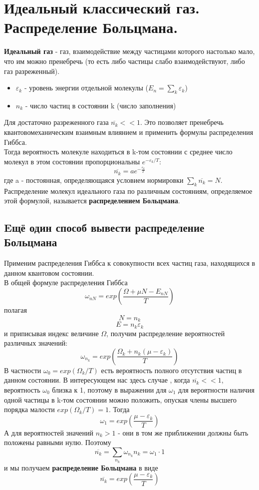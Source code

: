 \section{Идеальный классический газ. Распределение Больцмана.}
\textbf{Идеальный газ} - газ, взаимодействие между частицами которого настолько мало, что им можно пренебречь (то есть либо частицы слабо взаимодействуют, либо газ разреженный).
\begin{itemize}
	\item $\varepsilon_k$ - уровень энергии отдельной молекулы ($E_n = \sum_{k}\varepsilon_k$)
	\item $n_k$ - число частиц в состоянии k (число заполнения)
\end{itemize}
Для достаточно разреженного газа $\overline{n_k} << 1$. Это позволяет пренебречь квантовомеханическим взаимным влиянием и применить формулы распределения Гиббса.\\
Тогда вероятность молекуле находиться в k-том состоянии с среднее число молекул в этом состоянии пропорциональны $e^{-\varepsilon_k/T}$:
$$
\overline{n_k} = ae^{-\frac{\varepsilon_k}{T}}
$$
где a - постоянная, определяющаяся условием нормировки $\sum_{k}\overline{n_k} = N$.\\
Распределение молекул идеального газа по различным состояниям, определяемое этой формулой, называется \textbf{распределением Больцмана}.
\subsection{Eщё один способ вывести распределение Больцмана}
Применим распределения Гиббса к совокупности всех частиц газа, находящихся в данном квантовом состоянии.\\
В общей формуле распределения Гиббса
$$
\omega_{nN} = exp (\frac{\Omega + \mu N - E_{nN}}{T})
$$
полагая
$$
N = n_k
$$
$$
E = n_k \varepsilon_k
$$
и приписывая индекс величине $\Omega$, получим распределение вероятностей различных значений:
$$
\omega_{n_k} = exp (\frac{\Omega_k + n_k(\mu - \varepsilon_k)}{T})
$$
В частности $\omega_0 = exp (\Omega_k /T)$ есть вероятность полного отсутствия частиц в данном состоянии. В интересующем нас здесь случае , когда $\overline{n_k} << 1$, вероятность $\omega_0$ близка к 1, поэтому в выражении для $\omega_1$ для вероятности наличия одной частицы в k-том состоянии можно положить, опуская члены высшего порядка малости $exp (\Omega_k /T) = 1$. Тогда 
$$
\omega_1 = exp (\frac{\mu - \varepsilon_k} {T})
$$
А для вероятностей значений $n_k > 1$ - они в том же приближении должны быть положены равными нулю. Поэтому
$$
\overline{n_k} = \sum_{n_k} \omega_{n_k}n_k = \omega_1 \cdot 1
$$
и мы получаем \textbf{распределение Больцмана} в виде
$$
\overline{n_k} = exp (\frac{\mu - \varepsilon_k}{T})
$$
